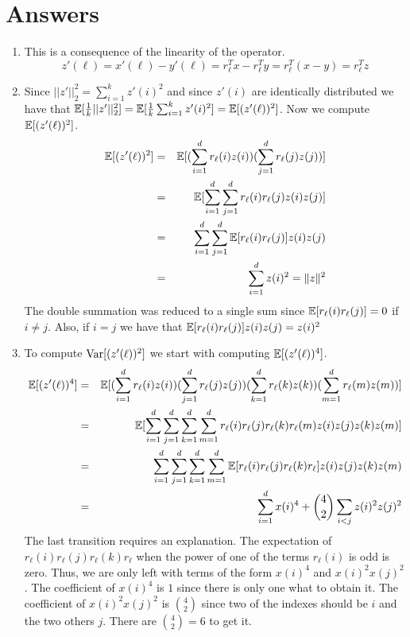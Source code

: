 \documentclass{article}
\begin{document}
\section{Answers}
\begin{enumerate}
\item This is a consequence of the linearity of the operator. 
\[
z'(\ell) = x'(\ell) - y'(\ell) = r_{\ell}^{T}x - r_{\ell}^{T}y = r_{\ell}^{T}(x-y) = r_{\ell}^{T}z 
\]
\item Since $||z'||_{2}^{2} = \sum_{i=1}^{k}z'(i)^2$ and since $z'(i)$ are identically distributed we have that 
${\mathbb E}[\frac{1}{k}||z'||_{2}^{2}] = {\mathbb E}[\frac{1}{k}\sum_{i=1}^{k}z'(i)^2] = {\mathbb E}[(z'(\ell))^2]$.
Now we compute ${\mathbb E}[(z'(\ell))^2]$.
\begin{eqnarray}
{\mathbb E}[(z'(\ell))^2] &=& {\mathbb E}[(\sum_{i=1}^{d} r_\ell(i) z(i))(\sum_{j=1}^{d} r_\ell(j) z(j))] \\
&=& {\mathbb E}[\sum_{i=1}^{d} \sum_{j=1}^{d} r_\ell(i) r_\ell(j)z(i) z(j)] \\
&=& \sum_{i=1}^{d} \sum_{j=1}^{d} {\mathbb E}[r_\ell(i) r_\ell(j)]z(i) z(j) \\
&=& \sum_{i=1}^{d} z(i)^2  = \|z\|^2
\end{eqnarray}
The double summation was reduced to a single sum since ${\mathbb E}[r_\ell(i)r_\ell(j)] = 0$ if $i \ne j$.
Also, if $i=j$ we have that ${\mathbb E}[r_\ell(i)r_\ell(j)]z(i)z(j) = z(i)^2$
\item To compute ${\operatorname{Var}}[(z'(\ell))^2]$ we start with computing ${\mathbb E}[(z'(\ell))^4]$.
\begin{eqnarray*}
{\mathbb E}[(z'(\ell))^4] &=& {\mathbb E}[(\sum_{i=1}^{d} r_\ell(i) z(i))(\sum_{j=1}^{d} r_\ell(j) z(j))(\sum_{k=1}^{d} r_\ell(k) z(k))(\sum_{m=1}^{d} r_\ell(m) z(m))] \\
&=& {\mathbb E}[\sum_{i=1}^{d}\sum_{j=1}^{d}\sum_{k=1}^{d}\sum_{m=1}^{d}r_\ell(i)r_\ell(j)r_\ell(k)r_\ell(m)z(i)z(j)z(k)z(m)] \\
&=& \sum_{i=1}^{d}\sum_{j=1}^{d}\sum_{k=1}^{d}\sum_{m=1}^{d} {\mathbb E}[r_\ell(i)r_\ell(j)r_\ell(k)r_\ell]z(i)z(j)z(k)z(m)\\
&=& \sum_{i=1}^{d}x(i)^4 + {4 \choose 2} \sum_{i<j}z(i)^2 z(j)^2
\end{eqnarray*}
The last transition requires an explanation. The expectation of $r_\ell(i)r_\ell(j)r_\ell(k)r_\ell$ when the power of one of 
the terms $r_\ell(i)$ is odd is zero. Thus, we are only left with terms of the form $x(i)^4$ and $x(i)^2 x(j)^2$.
The coefficient of $x(i)^4$ is $1$ since there is only one what to obtain it. The coefficient of $x(i)^2 x(j)^2$ is ${4 \choose 2}$
since two of the indexes should be $i$ and the two others $j$. There are ${4 \choose 2} = 6$ to get it.

\end{enumerate}
\end{document}
